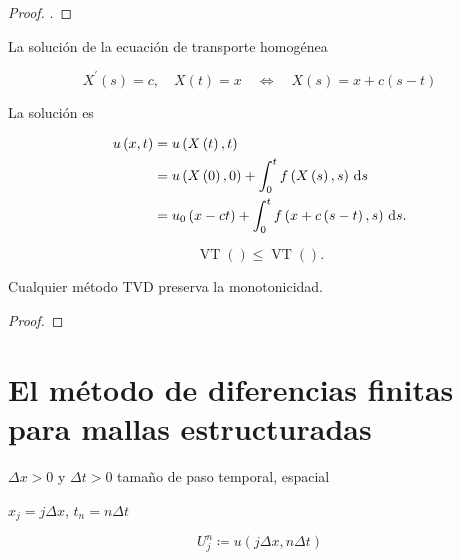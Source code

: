\begin{proof}
    .
\end{proof}

La solución de la ecuación de transporte homogénea

\begin{equation*}
    X^{\prime}\left(s\right)=c,\quad
    X\left(t\right)=x\quad\iff\quad
    X\left(s\right)=x+c\left(s-t\right)
\end{equation*}

La solución es

\begin{align*}
    u\left(x,t\right) & =
    u\left(X\left(t\right),t\right)      \\
                      & =
    u\left(X\left(0\right),0\right)+
    \int_{0}^{t}
    f\left(X\left(s\right),s\right)\dl s \\
                      & =
    u_{0}\left(x-ct\right)+
    \int_{0}^{t}f\left(x+c\left(s-t\right),s\right)\dl s.
\end{align*}

\begin{definition} %
    \begin{equation*}
        \operatorname{VT}\left(\right)\leq
        \operatorname{VT}\left(\right).
    \end{equation*}
\end{definition}

\begin{theorem}
    Cualquier método TVD preserva la monotonicidad.
\end{theorem}

\begin{proof}

\end{proof}

\section*{El método de diferencias finitas para mallas estructuradas}

$\Delta x>0$ y $\Delta t>0$ tamaño de paso temporal, espacial

$x_{j}=j\Delta x$, $t_{n}=n\Delta t$

\begin{equation*}
    U^{n}_{j}\coloneqq
    u\left(j\Delta x, n\Delta t\right)
\end{equation*}

